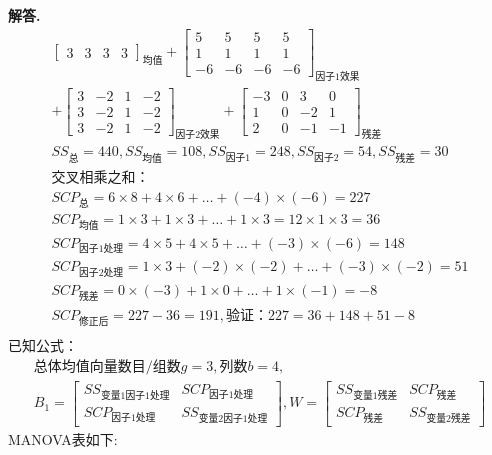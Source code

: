\documentclass[12pt, a4paper, oneside]{ctexart}
\newenvironment{solution}{\par\noindent\textbf{解答. }}{\par}
\begin{document}
\begin{solution}
\[\begin{gathered}
\begin{bmatrix}
                3 & 3 & 3 & 3
        \end{bmatrix}_{\text{均值}}+
        \begin{bmatrix}
            5 & 5 & 5 & 5 \\
            1 & 1 & 1 & 1 \\
            -6 & -6 & -6 & -6
        \end{bmatrix}_{\text{因子1效果}}\\
        +\begin{bmatrix}
            3 & -2 & 1 & -2 \\
            3 & -2 & 1 & -2 \\
            3 & -2 & 1 & -2
        \end{bmatrix}_{\text{因子2效果}}+
        \begin{bmatrix}
           -3 & 0 & 3 & 0 \\
            1 & 0 & -2 & 1 \\
            2 & 0 & -1 & -1
        \end{bmatrix}_{\text{残差}}\\
        {SS}_{\text{总}}=440, 
        {SS}_{\text{均值}}=108, 
        {SS}_{\text{因子1}}=248, 
        {SS}_{\text{因子2}}=54, 
        {SS}_{\text{残差}}=30\\
        \text{交叉相乘之和：}\\
        {SCP}_\text{总}=6 \times 8 + 4 \times 6 + \hdots+ (-4) \times (-6) = 227\\
        {SCP}_\text{均值}=1 \times 3 + 1 \times 3 + \hdots + 1 \times 3 =12 \times 1 \times 3= 36\\
        {SCP}_\text{因子1处理}=4 \times 5 + 4 \times 5 + \hdots + (-3) \times (-6) = 148\\
        {SCP}_\text{因子2处理}=1 \times 3 + (-2) \times (-2) + \hdots + (-3) \times (-2) = 51\\
        {SCP}_\text{残差}=0 \times (-3) + 1 \times 0 + \hdots + 1 \times (-1) = -8\\
        {SCP}_\text{修正后}=227-36=191,\text{验证：}227=36+148+51-8\\
    \end{gathered}
\]
已知公式：
\[
    \begin{gathered}
    \text{总体均值向量数目/组数}g=3, \text{列数}b=4,\\
    B_1=\begin{bmatrix} {SS}_{\text{变量1因子1处理}} & {SCP}_\text{因子1处理} \\ {SCP}_\text{因子1处理} & {SS}_{\text{变量2因子1处理}} \end{bmatrix},
    W=\begin{bmatrix} {SS}_{\text{变量1残差}} & {SCP}_\text{残差} \\ {SCP}_\text{残差} & {SS}_{\text{变量2残差}} \end{bmatrix}
    \end{gathered}
\]
MANOVA表如下:


\end{solution}
\end{document}
